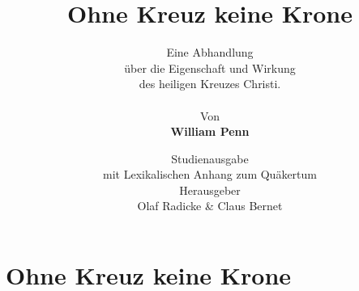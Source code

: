 \documentclass[pdftex,pagesize,9pt]{scrbook}
\begin{document}
\null\newpage

\author{
Eine Abhandlung \\
über die Eigenschaft und Wirkung
\\
des heiligen Kreuzes Christi.
\\
\\
Von
\\
\textbf{William Penn}
}

\title{Ohne Kreuz keine Krone}
\date{
\vspace{3cm}
Studienausgabe\\
mit Lexikalischen Anhang zum Quäkertum\\
\vfill
Herausgeber \\
 Olaf Radicke \& Claus Bernet
}

\maketitle

\frontmatter

\tableofcontents


\mainmatter



\setcounter{secnumdepth}{-2}
\part{Ohne Kreuz keine Krone}

\end{document}
